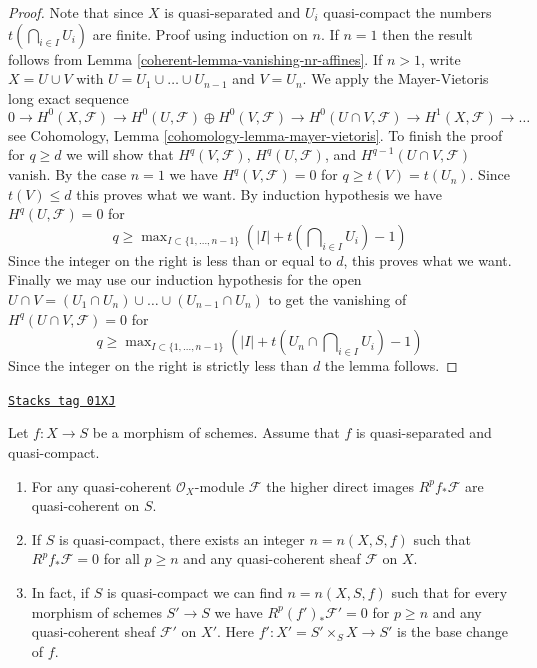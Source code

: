\begin{proof}

Note that since $X$ is quasi-separated and $U_i$ quasi-compact the numbers
$t(\bigcap_{i \in I} U_i)$ are finite. Proof using induction on $n$.
If $n = 1$ then the result follows from Lemma \ref{coherent-lemma-vanishing-nr-affines}.
If $n > 1$, write $X = U \cup V$ with $U = U_1 \cup \ldots \cup U_{n - 1}$
and $V = U_n$. We apply the Mayer-Vietoris long exact sequence
$$
0 \to
H^0(X, \mathcal{F}) \to
H^0(U, \mathcal{F}) \oplus H^0(V, \mathcal{F}) \to
H^0(U \cap V, \mathcal{F}) \to
H^1(X, \mathcal{F}) \to \ldots
$$
see Cohomology, Lemma \ref{cohomology-lemma-mayer-vietoris}.
To finish the proof for $q \geq d$ we will show that
$H^q(V, \mathcal{F})$, $H^q(U, \mathcal{F})$, and
$H^{q - 1}(U \cap V, \mathcal{F})$ vanish.
By the case $n = 1$ we have $H^q(V, \mathcal{F}) = 0$ for
$q \geq t(V) = t(U_n)$. Since $t(V) \leq d$ this proves what we want.
By induction hypothesis we have $H^q(U, \mathcal{F}) = 0$ for
$$
q \geq \max\nolimits_{I \subset \{1, \ldots, n - 1\}}
\left(|I| + t(\bigcap\nolimits_{i \in I} U_i) - 1\right)
$$
Since the integer on the right is less than or equal to $d$, this
proves what we want. Finally we may use our induction hypothesis for the open
$U \cap V = (U_1 \cap U_n) \cup \ldots \cup (U_{n - 1} \cap U_n)$ to get
the vanishing of $H^q(U \cap V, \mathcal{F}) = 0$ for
$$
q \geq \max\nolimits_{I \subset \{1, \ldots, n - 1\}}
\left(|I| + t(U_n \cap \bigcap\nolimits_{i \in I} U_i) - 1\right)
$$
Since the integer on the right is strictly less than $d$
the lemma follows.
\end{proof}

\begin{lemma}
\label{coherent-lemma-quasi-coherence-higher-direct-images}
\href{https://stacks.math.columbia.edu/tag/01XJ}{\texttt{Stacks tag 01XJ}}

Let $f : X \to S$ be a morphism of schemes.
Assume that $f$ is quasi-separated and quasi-compact.
\begin{enumerate}
\item For any quasi-coherent $\mathcal{O}_X$-module $\mathcal{F}$ the
higher direct images $R^pf_*\mathcal{F}$ are quasi-coherent on $S$.
\item If $S$ is quasi-compact, there exists an integer $n = n(X, S, f)$
such that $R^pf_*\mathcal{F} = 0$ for all $p \geq n$ and any
quasi-coherent sheaf $\mathcal{F}$ on $X$.
\item In fact, if $S$ is quasi-compact we can find $n = n(X, S, f)$
such that for every
morphism of schemes $S' \to S$ we have $R^p(f')_*\mathcal{F}' = 0$
for $p \geq n$ and any quasi-coherent sheaf $\mathcal{F}'$
on $X'$. Here $f' : X' = S' \times_S X \to S'$ is the base change of $f$.
\end{enumerate}
\end{lemma}

